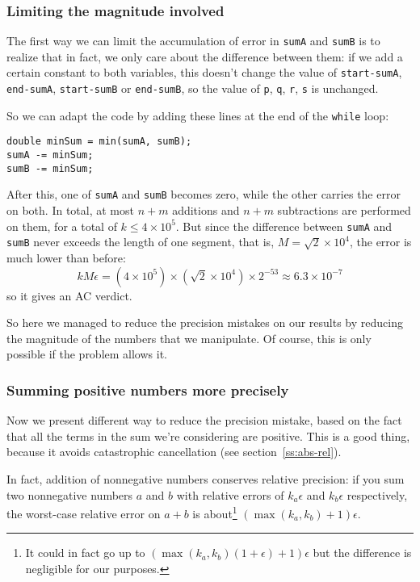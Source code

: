 \subsubsection{Limiting the magnitude involved}
The first way we can limit the accumulation of error in \lstinline|sumA| and \lstinline|sumB| is to realize that in fact, we only care about the difference between them: if we add a certain constant to both variables, this doesn't change the value of \lstinline|start-sumA|, \lstinline|end-sumA|, \lstinline|start-sumB| or \lstinline|end-sumB|, so the value of \lstinline|p|, \lstinline|q|, \lstinline|r|, \lstinline|s| is unchanged.

So we can adapt the code by adding these lines at the end of the \lstinline|while| loop:
\begin{lstlisting}
double minSum = min(sumA, sumB);
sumA -= minSum;
sumB -= minSum;
\end{lstlisting}

After this, one of \lstinline|sumA| and \lstinline|sumB| becomes zero, while the other carries the error on both. In total, at most $n+m$ additions and $n+m$ subtractions are performed on them, for a total of $k \leq 4\times 10^5$. But since the difference between \lstinline|sumA| and \lstinline|sumB| never exceeds the length of one segment, that is, $M=\sqrt{2} \times 10^4$, the error is much lower than before:
\[kM\epsilon = \left(4\times 10^5\right) \times \left(\sqrt{2}\times 10^4\right) \times 2^{-53} \approx 6.3 \times 10^{-7}\]
so it gives an AC verdict.

So here we managed to reduce the precision mistakes on our results by reducing the magnitude of the numbers that we manipulate. Of course, this is only possible if the problem allows it.

\subsubsection{Summing positive numbers more precisely}
Now we present different way to reduce the precision mistake, based on the fact that all the terms in the sum we're considering are positive. This is a good thing, because it avoids catastrophic cancellation (see section~\ref{ss:abs-rel}).

In fact, addition of nonnegative numbers conserves relative precision: if you sum two nonnegative numbers $a$ and $b$ with relative errors of $k_a\epsilon$ and $k_b\epsilon$ respectively, the worst-case relative error on $a+b$ is about\footnote{It could in fact go up to $(\max(k_a,k_b)(1+\epsilon)+1)\epsilon$ but the difference is negligible for our purposes.} $(\max(k_a,k_b)+1)\epsilon$.

